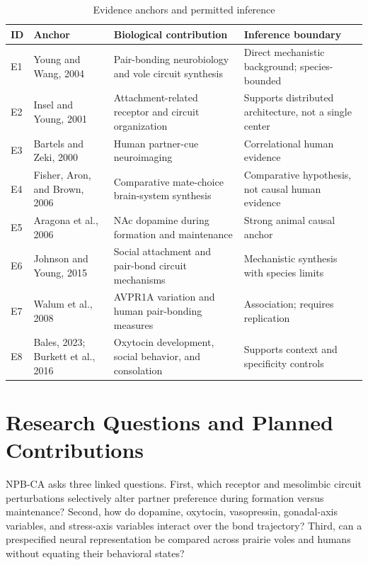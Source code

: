 \documentclass[conference]{IEEEtran}
\begin{document}
\begin{table}[t]
\caption{Evidence anchors and permitted inference}
\label{tab:evidence}
\centering
\small
\begin{tabularx}{\textwidth}{p{}p{}p{}X}
\toprule
ID & Anchor & Biological contribution & Inference boundary \\
\midrule
E1 & Young and Wang, 2004 \cite{young2004} & Pair-bonding neurobiology and vole circuit synthesis & Direct mechanistic background; species-bounded \\
E2 & Insel and Young, 2001 \cite{insel2001} & Attachment-related receptor and circuit organization & Supports distributed architecture, not a single center \\
E3 & Bartels and Zeki, 2000 \cite{bartels2000} & Human partner-cue neuroimaging & Correlational human evidence \\
E4 & Fisher, Aron, and Brown, 2006 \cite{fisher2006} & Comparative mate-choice brain-system synthesis & Comparative hypothesis, not causal human evidence \\
E5 & Aragona et al., 2006 \cite{aragona2006} & NAc dopamine during formation and maintenance & Strong animal causal anchor \\
E6 & Johnson and Young, 2015 \cite{johnson2015} & Social attachment and pair-bond circuit mechanisms & Mechanistic synthesis with species limits \\
E7 & Walum et al., 2008 \cite{walum2008} & AVPR1A variation and human pair-bonding measures & Association; requires replication \\
E8 & Bales, 2023; Burkett et al., 2016 \cite{bales2023,burkett2016} & Oxytocin development, social behavior, and consolation & Supports context and specificity controls \\
\bottomrule
\end{tabularx}
\end{table}

\section{Research Questions and Planned Contributions}
NPB-CA asks three linked questions. First, which receptor and mesolimbic circuit perturbations selectively alter partner preference during formation versus maintenance? Second, how do dopamine, oxytocin, vasopressin, gonadal-axis variables, and stress-axis variables interact over the bond trajectory? Third, can a prespecified neural representation be compared across prairie voles and humans without equating their behavioral states?
\end{document}
